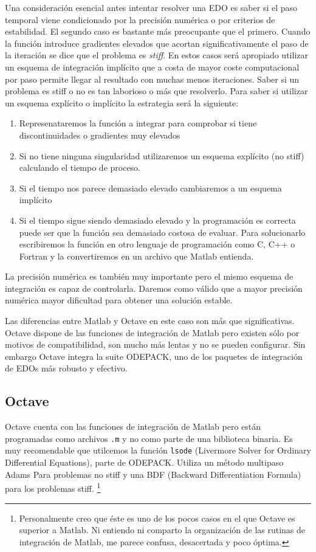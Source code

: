 Una consideración esencial antes intentar resolver una EDO es saber
si el paso temporal viene condicionado por la precisión numérica o
por criterios de estabilidad. El segundo caso es bastante más preocupante
que el primero. Cuando la función introduce gradientes elevados que
acortan significativamente el paso de la iteración se dice que el
problema es \emph{stiff}. En estos casos será apropiado
utilizar un esquema de integración implícito que a costa de mayor
coste computacional por paso permite llegar al resultado con muchas
menos iteraciones. Saber si un problema es stiff o no es tan laborioso
o más que resolverlo. Para saber si utilizar un esquema explícito
o implícito la estrategia será la siguiente:

\begin{enumerate}
\item Represenataremos la función a integrar para comprobar si tiene discontinuidades
o gradientes muy elevados
\item Si no tiene ninguna singularidad utilizaremos un esquema explícito
(no stiff) calculando el tiempo de proceso.
\item Si el tiempo nos parece demasiado elevado cambiaremos a un esquema
implícito
\item Si el tiempo sigue siendo demasiado elevado y la programación es correcta
puede ser que la función sea demasiado costosa de evaluar. Para solucionarlo
escribiremos la función en otro lenguaje de programación como C, C++
o Fortran y la convertiremos en un archivo que Matlab entienda.
\end{enumerate}
La precisión numérica es también muy importante pero el mismo esquema
de integración es capaz de controlarla. Daremos como válido que a
mayor precisión numérica mayor dificultad para obtener una solución
estable.

Las diferencias entre Matlab y Octave en este caso son más que significativas.
Octave dispone de las funciones de integración de Matlab pero existen
sólo por motivos de compatibilidad, son mucho más lentas y no se pueden
configurar. Sin embargo Octave integra la suite ODEPACK,
uno de los paquetes de integración de EDOs más robusto y efectivo.


\subsection{Octave}

Octave cuenta con las funciones de integración de Matlab pero están
programadas como archivos \texttt{.m} y no como parte de una
biblioteca binaria. Es muy recomendable que utilcemos la función
\texttt{lsode} (Livermore Solver for Ordinary Differential Equations),
parte de ODEPACK.  Utiliza un método multipaso Adams Para problemas no
stiff y una BDF (Backward Differentiation Formula) para los
problemas stiff.%
\footnote{Personalmente creo que éste es uno de los pocos casos en el
  que Octave es superior a Matlab. Ni entiendo ni comparto la
  organización de las rutinas de integración de Matlab, me parece
  confusa, desacertada y poco óptima.%
}

